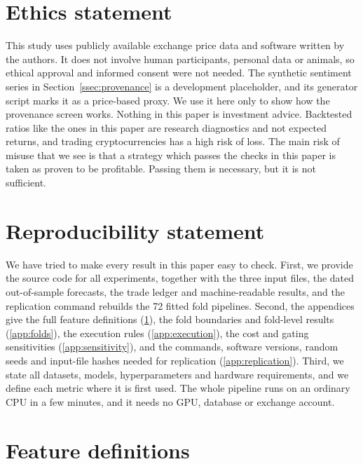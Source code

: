 \documentclass[preprint,12pt,authoryear,a4paper]{elsarticle}
\begin{document}
\section*{Ethics statement}

This study uses publicly available exchange price data and software written by the
authors. It does not involve human participants, personal data or animals, so
ethical approval and informed consent were not needed. The synthetic sentiment
series in Section~\ref{ssec:provenance} is a development placeholder, and its
generator script marks it as a price-based proxy. We use it here only to show how
the provenance screen works. Nothing in this paper is investment advice. Backtested
ratios like the ones in this paper are research diagnostics and not expected
returns, and trading cryptocurrencies has a high risk of loss. The main risk of
misuse that we see is that a strategy which passes the checks in this paper is
taken as proven to be profitable. Passing them is necessary, but it is not
sufficient.

\section*{Reproducibility statement}

We have tried to make every result in this paper easy to check. First, we provide
the source code for all experiments, together with the three input files, the dated
out-of-sample forecasts, the trade ledger and machine-readable results, and the
replication command rebuilds the 72 fitted fold pipelines. Second, the appendices
give the full feature definitions (\ref{app:features}), the fold boundaries and
fold-level results (\ref{app:folds}), the execution rules (\ref{app:execution}),
the cost and gating sensitivities (\ref{app:sensitivity}), and the commands,
software versions, random seeds and input-file hashes needed for replication
(\ref{app:replication}). Third, we state all datasets, models, hyperparameters and
hardware requirements, and we define each metric where it is first used. The whole
pipeline runs on an ordinary CPU in a few minutes, and it needs no GPU, database or
exchange account.

\appendix

\section{Feature definitions}\label{app:features}
\end{document}
